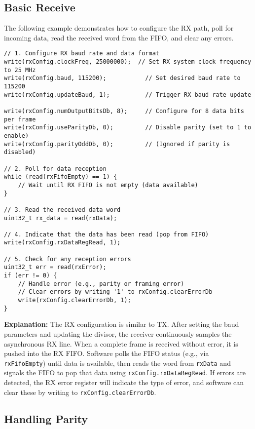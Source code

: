 \subsection{Basic Receive}

The following example demonstrates how to configure the RX path, poll for incoming data, read the received word from the FIFO, and clear any errors.

\begin{verbatim}
// 1. Configure RX baud rate and data format
write(rxConfig.clockFreq, 25000000);  // Set RX system clock frequency to 25 MHz
write(rxConfig.baud, 115200);           // Set desired baud rate to 115200
write(rxConfig.updateBaud, 1);          // Trigger RX baud rate update

write(rxConfig.numOutputBitsDb, 8);     // Configure for 8 data bits per frame
write(rxConfig.useParityDb, 0);         // Disable parity (set to 1 to enable)
write(rxConfig.parityOddDb, 0);         // (Ignored if parity is disabled)

// 2. Poll for data reception
while (read(rxFifoEmpty) == 1) {
    // Wait until RX FIFO is not empty (data available)
}

// 3. Read the received data word
uint32_t rx_data = read(rxData);

// 4. Indicate that the data has been read (pop from FIFO)
write(rxConfig.rxDataRegRead, 1);

// 5. Check for any reception errors
uint32_t err = read(rxError);
if (err != 0) {
    // Handle error (e.g., parity or framing error)
    // Clear errors by writing '1' to rxConfig.clearErrorDb
    write(rxConfig.clearErrorDb, 1);
}
\end{verbatim}

\vspace{1em}
\noindent
\textbf{Explanation:}  
The RX configuration is similar to TX. After setting the baud parameters and updating the divisor, the receiver continuously samples the asynchronous RX line. When a complete frame is received without error, it is pushed into the RX FIFO. Software polls the FIFO status (e.g., via \texttt{rxFifoEmpty}) until data is available, then reads the word from \texttt{rxData} and signals the FIFO to pop that data using \texttt{rxConfig.rxDataRegRead}. If errors are detected, the RX error register will indicate the type of error, and software can clear these by writing to \texttt{rxConfig.clearErrorDb}.

\subsection{Handling Parity}

